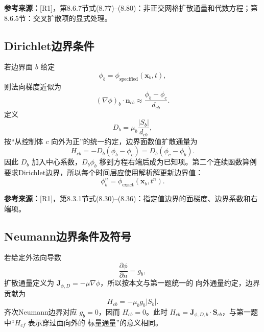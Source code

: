 \documentclass[UTF8,12pt,a4paper]{ctexart}
\numberwithin{equation}{section}
\newcommand{\Rone}{\textnormal{[R1]}}
\newcommand{\source}[1]{%
  \par\smallskip
  \noindent\colorbox{sourcebg}{%
    \parbox{0.955\linewidth}{\raggedright\footnotesize\color{sourcegray}\textbf{参考来源：}#1}%
  }
  \par\smallskip
}
\newcommand{\Sf}{\bm S}
\newcommand{\xf}{\bm x}
\begin{document}
\source{\Rone，第8.6.7节式(8.77)--(8.80)：非正交网格扩散通量和代数方程；第8.6.5节：交叉扩散项的显式处理。}

\subsection{Dirichlet边界条件}

若边界面 $b$ 给定
\begin{equation}
  \phi_b=\phi_{\mathrm{specified}}(\xf_b,t),
  \label{eq:dirichlet_value}
\end{equation}
则法向梯度近似为
\begin{equation}
  (\nabla\phi)_b\cdot\bm n_{cb}
  \approx\frac{\phi_b-\phi_c}{d_{cb}}.
  \label{eq:dirichlet_gradient}
\end{equation}
定义
\begin{equation}
  D_b=\mu_b\frac{|S_b|}{d_{cb}},
  \label{eq:boundary_D}
\end{equation}
按“从控制体 $c$ 向外为正”的统一约定，边界面数值扩散通量为
\begin{equation}
  \boxed{
  H_{cb}=-D_b(\phi_b-\phi_c)
  =D_b(\phi_c-\phi_b)}.
  \label{eq:dirichlet_flux}
\end{equation}
因此 $D_b$ 加入中心系数，$D_b\phi_b$ 移到方程右端后成为已知项。第二个连续函数算例要求Dirichlet边界，所以每个时间层应使用解析解更新边界值：
\begin{equation}
  \phi_b^n=\phi_{\mathrm{exact}}(\xf_b,t^n).
  \label{eq:time_dirichlet}
\end{equation}

\source{\Rone，第8.3.1节式(8.30)--(8.36)：指定值边界的面梯度、边界系数和右端项。}

\subsection{Neumann边界条件及符号}

若给定外法向导数
\begin{equation}
  \frac{\partial\phi}{\partial n}=g_b,
  \label{eq:neumann_gradient}
\end{equation}
扩散通量定义为 $\bm J_{\phi,D}=-\mu\nabla\phi$，所以按本文与第一题统一的
向外通量约定，边界贡献为
\begin{equation}
  \boxed{H_{cb}=-\mu_bg_b|S_b|}.
  \label{eq:neumann_flux}
\end{equation}
齐次Neumann边界对应 $g_b=0$，因而 $H_{cb}=0$。此时
$H_{cb}=\bm J_{\phi,D,b}\cdot\Sf_{cb}$，与第一题中“$H_{cf}$ 表示穿过面向外的
标量通量”的意义相同。
\end{document}
